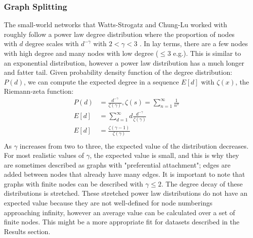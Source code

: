 \documentclass{article}
\begin{document}
\subsubsection{Graph Splitting}
The small-world networks that Watts-Strogatz and Chung-Lu worked with roughly follow a power law degree distribution where the proportion of nodes with $d$ degree scales with $d^{-\gamma}$ with $2 < \gamma < 3$ \cite{Chung:2004,Watts:1998}. In lay terms, there are a few nodes with high degree and many nodes with low degree ($\leq3$ e.g.). This is similar to an exponential distribution, however a power law distribution has a much longer and fatter tail. Given probability density function of the degree distribution: $P(d)$, we can compute the expected degree in a sequence $E[d]$ with $\zeta(x)$, the Riemann-zeta function:\\
\begin{align*}
P(d) & = \frac{d^{-\gamma}}{\zeta(\gamma)},               \zeta(s) = \sum_{n=1}^{\infty} \frac{1}{n^s}\\
E[d] & = \sum_{d=1}^{\infty} d \frac{d^{-\gamma}}{\zeta(\gamma)} \\
E[d] & = \frac{\zeta(\gamma-1)}{\zeta(\gamma)}\\ 
\end{align*}
As $\gamma$ increases from two to three, the expected value of the distribution decreases. For most realistic values of $\gamma$, the expected value is small, and this is why they are sometimes described as graphs with "preferential attachment"; edges are added between nodes that already have many edges. It is important to note that graphs with finite nodes can be described with $\gamma \leq 2$. The degree decay of these distributions is stretched. These stretched power law distributions do not have an expected value because they are not well-defined for node numberings approaching infinity, however an average value can be calculated over a set of finite nodes. This might be a more appropriate fit for datasets described in the Results section.\\
\end{document}

